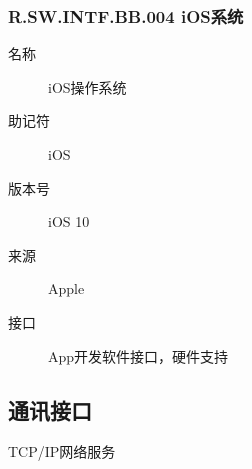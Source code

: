     \subsubsection{R.SW.INTF.BB.004 iOS系统}
	\begin{center}\begin{description}
      \item[名称] iOS操作系统
      \item[助记符] iOS
      \item[版本号] iOS 10
	\item[来源] Apple
	\item[接口] App开发软件接口，硬件支持
	\end{description}\end{center}

  \subsection{通讯接口}
	TCP/IP网络服务

